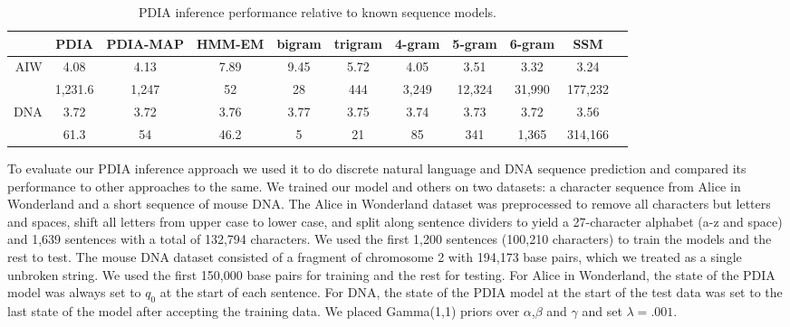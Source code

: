 \begin{table}[t]
    \begin{center}
    \setlength{\tabcolsep}{1.3mm}
\begin{tabular}{r|cccccccccc}
\hline
& PDIA  & PDIA-MAP &  HMM-EM & bigram& trigram & 4-gram & 5-gram & 6-gram & SSM \\
\hline
AIW & 4.08 & 4.13 &  7.89 & 9.45 & 5.72 & 4.05 & 3.51 & 3.32 & 3.24 \\
  & 1,231.6 & 1,247 &  52 & 28 & 444 & 3,249 & 12,324 & 31,990 & 177,232 \\
\hline
\hline
DNA & 3.72 & 3.72 &  3.76 & 3.77 & 3.75 & 3.74 & 3.73 & 3.72 & 3.56 \\
 & 61.3 & 54 & 46.2 &  5 & 21 & 85 & 341 & 1,365 & 314,166 \\
\hline
\end{tabular}
\end{center}
\caption[Short]{PDIA inference performance relative to known sequence models.}
\label{table:results}
\end{table}

To evaluate our PDIA inference approach we used it to do discrete natural language and DNA sequence prediction and compared its performance to other approaches to the same.  We trained our model and others on two datasets: a character sequence from Alice in Wonderland and a short sequence of mouse DNA.  The Alice in Wonderland dataset was preprocessed to remove all characters but letters and spaces, shift all letters from upper case to lower case, and split along sentence dividers to yield a 27-character alphabet (a-z and space) and 1,639 sentences with a total of 132,794 characters.  We used the first 1,200 sentences (100,210 characters) to train the models and the rest to test.    The mouse DNA dataset consisted of a fragment of chromosome 2 with 194,173 base pairs, which we treated as a single unbroken string.  We used the first 150,000 base pairs for training and the rest for testing.  For Alice in Wonderland, the state of the PDIA model was always set to $q_0$ at the start of each sentence.  For DNA, the state of the PDIA model at the start of the test data was set to the last state of the model after accepting the training data.  We placed Gamma(1,1) priors over $\alpha$,$\beta$ and $\gamma$ and set $\lambda=.001.$


